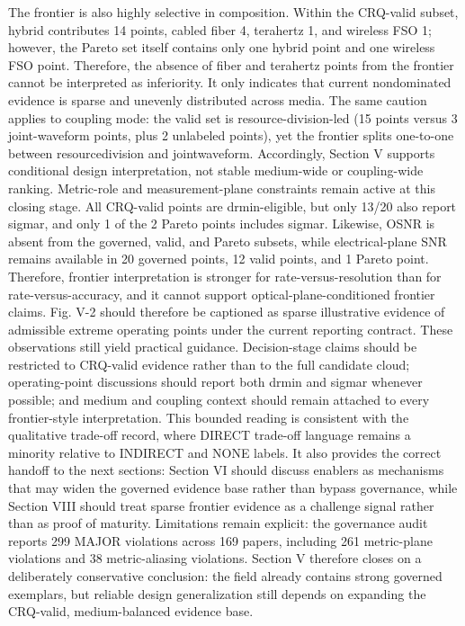 {}The frontier is also highly selective in composition. Within the CRQ-valid subset, hybrid contributes 14 points, cabled fiber 4, terahertz 1, and wireless FSO 1; however, the Pareto set itself contains only one hybrid point and one wireless FSO point. Therefore, the absence of fiber and terahertz points from the frontier cannot be interpreted as inferiority. It only indicates that current nondominated evidence is sparse and unevenly distributed across media. The same caution applies to coupling mode: the valid set is resource-division-led (15 points versus 3 joint-waveform points, plus 2 unlabeled points), yet the frontier splits one-to-one between resource\markdownRendererUnderscore{}division and joint\markdownRendererUnderscore{}waveform. Accordingly, Section V supports conditional design interpretation, not stable medium-wide or coupling-wide ranking.\markdownRendererParagraphSeparator
{}Metric-role and measurement-plane constraints remain active at this closing stage. All CRQ-valid points are drmin-eligible, but only 13/20 also report sigma\markdownRendererUnderscore{}r, and only 1 of the 2 Pareto points includes sigma\markdownRendererUnderscore{}r. Likewise, OSNR is absent from the governed, valid, and Pareto subsets, while electrical-plane SNR remains available in 20 governed points, 12 valid points, and 1 Pareto point. Therefore, frontier interpretation is stronger for rate-versus-resolution than for rate-versus-accuracy, and it cannot support optical-plane-conditioned frontier claims. Fig. V-2 should therefore be captioned as sparse illustrative evidence of admissible extreme operating points under the current reporting contract.\markdownRendererParagraphSeparator
{}These observations still yield practical guidance. Decision-stage claims should be restricted to CRQ-valid evidence rather than to the full candidate cloud; operating-point discussions should report both drmin and sigma\markdownRendererUnderscore{}r whenever possible; and medium and coupling context should remain attached to every frontier-style interpretation. This bounded reading is consistent with the qualitative trade-off record, where DIRECT trade-off language remains a minority relative to INDIRECT and NONE labels. It also provides the correct handoff to the next sections: Section VI should discuss enablers as mechanisms that may widen the governed evidence base rather than bypass governance, while Section VIII should treat sparse frontier evidence as a challenge signal rather than as proof of maturity. Limitations remain explicit: the governance audit reports 299 MAJOR violations across 169 papers, including 261 metric-plane violations and 38 metric-aliasing violations. Section V therefore closes on a deliberately conservative conclusion: the field already contains strong governed exemplars, but reliable design generalization still depends on expanding the CRQ-valid, medium-balanced evidence base.\markdownRendererParagraphSeparator

